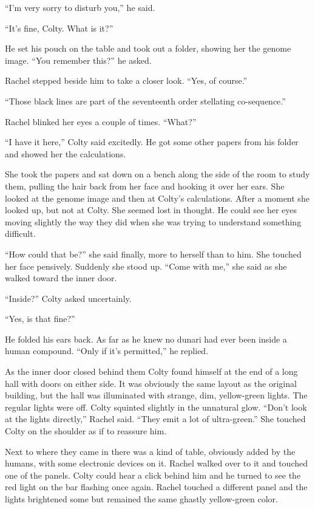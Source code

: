 ``I'm very sorry to disturb you,'' he said.

``It's fine, Colty. What is it?''

He set his pouch on the table and took out a folder, showing her the genome image. ``You
remember this?'' he asked.

Rachel stepped beside him to take a closer look. ``Yes, of course.''

``Those black lines are part of the seventeenth order stellating co-sequence.''

Rachel blinked her eyes a couple of times. ``What?''

``I have it here,'' Colty said excitedly. He got some other papers from his folder and showed
her the calculations.

She took the papers and sat down on a bench along the side of the room to study them, pulling
the hair back from her face and hooking it over her ears. She looked at the genome image and
then at Colty's calculations. After a moment she looked up, but not at Colty. She seemed lost in
thought. He could see her eyes moving slightly the way they did when she was trying to
understand something difficult.

``How could that be?'' she said finally, more to herself than to him. She touched her face
pensively. Suddenly she stood up. ``Come with me,'' she said as she walked toward the inner
door.

``Inside?'' Colty asked uncertainly.

``Yes, is that fine?''

He folded his ears back. As far as he knew no dunari had ever been inside a human compound.
``Only if it's permitted,'' he replied.

As the inner door closed behind them Colty found himself at the end of a long hall with doors on
either side. It was obviously the same layout as the original building, but the hall was
illuminated with strange, dim, yellow-green lights. The regular lights were off. Colty squinted
slightly in the unnatural glow. ``Don't look at the lights directly,'' Rachel said. ``They emit
a lot of ultra-green.'' She touched Colty on the shoulder as if to reassure him.

Next to where they came in there was a kind of table, obviously added by the humans, with some
electronic devices on it. Rachel walked over to it and touched one of the panels. Colty could
hear a click behind him and he turned to see the red light on the bar flashing once again.
Rachel touched a different panel and the lights brightened some but remained the same ghastly
yellow-green color.

